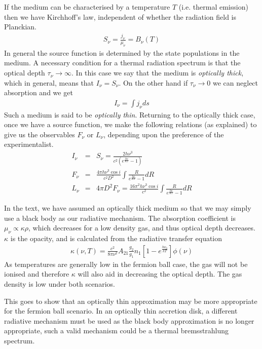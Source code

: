 If the medium can be characterised by a temperature $T$ (i.e. thermal emission) then we have Kirchhoff's law, independent of whether the
radiation field is Planckian.
\begin{eqnarray*}
	S_\nu = \frac{j_\nu}{\mu_\nu} = B_\nu(T)
\end{eqnarray*}
In general the source function is determined by the state populations in the medium. A necessary condition for a thermal radiation spectrum
is that the optical depth $\tau_\nu \rightarrow \infty$. In this case we say that the medium is {\it optically thick}, which in general,
means that $I_\nu=S_\nu$. On the other hand if $\tau_\nu \rightarrow 0$ we can neglect absorption and we get
\begin{eqnarray*}
	I_\nu=\int j_\nu ds
\end{eqnarray*}
Such a medium is said to be {\it optically thin}. Returning to the optically thick case, once we have a source function, we make the
following relations (as explained) to give us the observables $F_\nu$ or $L_\nu$, depending upon the preference of the experimentalist.
\begin{eqnarray*}
	I_\nu &=& S_\nu = \frac{2h\nu^3}{c^2\left(e^{\frac{h\nu}{KT}}-1\right)} \\
	F_\nu &=& \frac{4\pi h \nu^3\cos{i}}{c^2D^2} \int\frac{R}{e^{\frac{h\nu}{KT}}-1}dR \\
	L_\nu &=& 4\pi D^2 F_\nu = \frac{16\pi^2 h \nu^3\cos{i}}{c^2} \int\frac{R}{e^{\frac{h\nu}{KT}}-1}dR
\end{eqnarray*}

In the text, we have assumed an optically thick medium so that we may simply use a black body as our radiative mechanism. The absorption
coefficient is $\mu_\nu \propto \kappa \rho$, which decreases for a low density gas, and thus optical depth decreases.
$\kappa$ is the opacity, and is calculated from the radiative transfer equation
\begin{eqnarray*}
	\kappa(\nu ,T)=\frac{c^2}{8\pi \nu^2}A_{21}\frac{g_2}{g_1}n_1\left[1-e^{\frac{h\nu_0}{kT}}\right]\phi(\nu)
\end{eqnarray*}
As temperatures are generally low in the fermion ball case, the gas will not be ionised and therefore $\kappa$ will also aid in
decreasing the optical depth. The gas density is low under both scenarios.

This goes to show that an optically thin approximation may be more appropriate for the fermion ball scenario.
In an optically thin accretion disk, a different radiative mechanism must be used as the black body approximation is
no longer appropriate, such a valid mechanism could be a thermal bremsstrahlung spectrum.
